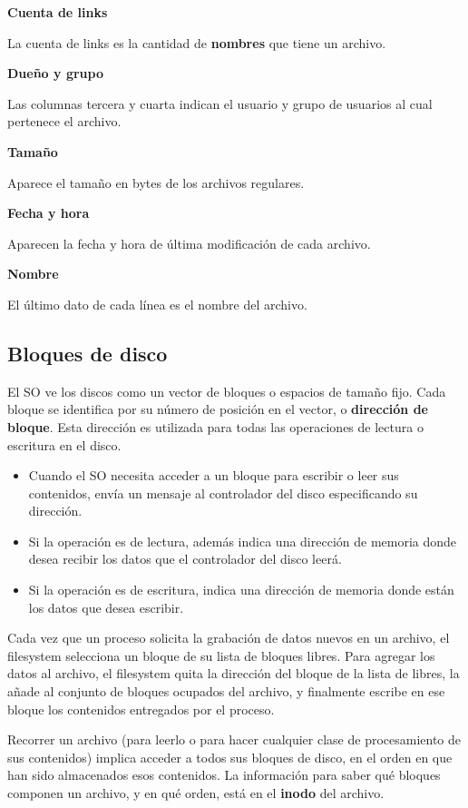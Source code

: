 \documentclass[spanish,a4paper,]{article}
\providecommand{\tightlist}{%
  \setlength{\itemsep}{0pt}\setlength{\parskip}{0pt}}
\begin{document}
\textbf{Cuenta de links}

La cuenta de links es la cantidad de \textbf{nombres} que tiene un
archivo.

\textbf{Dueño y grupo}

Las columnas tercera y cuarta indican el usuario y grupo de usuarios al
cual pertenece el archivo.

\textbf{Tamaño}

Aparece el tamaño en bytes de los archivos regulares.

\textbf{Fecha y hora}

Aparecen la fecha y hora de última modificación de cada archivo.

\textbf{Nombre}

El último dato de cada línea es el nombre del archivo.

\hypertarget{bloques-de-disco}{%
\subsection{Bloques de disco}\label{bloques-de-disco}}

El SO ve los discos como un vector de bloques o espacios de tamaño fijo.
Cada bloque se identifica por su número de posición en el vector, o
\textbf{dirección de bloque}. Esta dirección es utilizada para todas las
operaciones de lectura o escritura en el disco.

\begin{itemize}
\tightlist
\item
  Cuando el SO necesita acceder a un bloque para escribir o leer sus
  contenidos, envía un mensaje al controlador del disco especificando su
  dirección.
\item
  Si la operación es de lectura, además indica una dirección de memoria
  donde desea recibir los datos que el controlador del disco leerá.
\item
  Si la operación es de escritura, indica una dirección de memoria donde
  están los datos que desea escribir.
\end{itemize}

Cada vez que un proceso solicita la grabación de datos nuevos en un
archivo, el filesystem selecciona un bloque de su lista de bloques
libres. Para agregar los datos al archivo, el filesystem quita la
dirección del bloque de la lista de libres, la añade al conjunto de
bloques ocupados del archivo, y finalmente escribe en ese bloque los
contenidos entregados por el proceso.

Recorrer un archivo (para leerlo o para hacer cualquier clase de
procesamiento de sus contenidos) implica acceder a todos sus bloques de
disco, en el orden en que han sido almacenados esos contenidos. La
información para saber qué bloques componen un archivo, y en qué orden,
está en el \textbf{inodo} del archivo.
\end{document}
